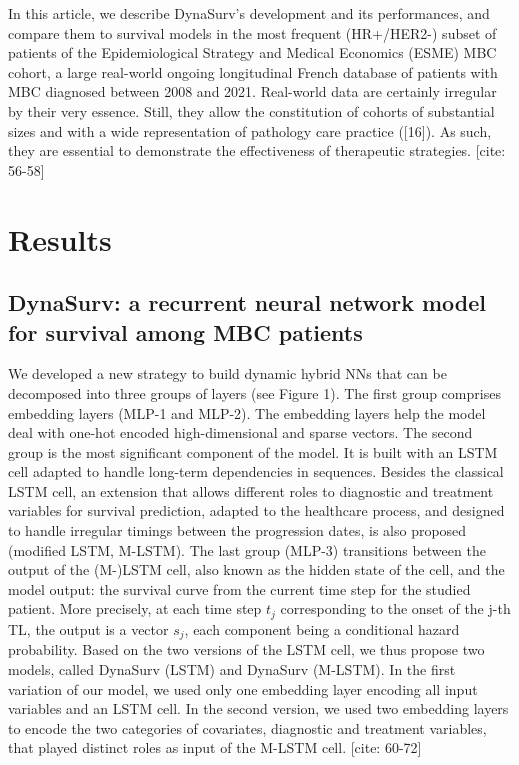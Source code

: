 \documentclass[a4paper,10pt]{article}
\begin{document}
In this article, we describe DynaSurv's development and its performances, and compare them to survival models in the most frequent (HR+/HER2-) subset of patients of the Epidemiological Strategy and Medical Economics (ESME) MBC cohort, a large real-world ongoing longitudinal French database of patients with MBC diagnosed between 2008 and 2021. Real-world data are certainly irregular by their very essence. Still, they allow the constitution of cohorts of substantial sizes and with a wide representation of pathology care practice ([16]). As such, they are essential to demonstrate the effectiveness of therapeutic strategies. [cite: 56-58]

\section{Results}

\subsection{DynaSurv: a recurrent neural network model for survival among MBC patients}
We developed a new strategy to build dynamic hybrid NNs that can be decomposed into three groups of layers (see Figure 1). The first group comprises embedding layers (MLP-1 and MLP-2). The embedding layers help the model deal with one-hot encoded high-dimensional and sparse vectors. The second group is the most significant component of the model. It is built with an LSTM cell adapted to handle long-term dependencies in sequences. Besides the classical LSTM cell, an extension that allows different roles to diagnostic and treatment variables for survival prediction, adapted to the healthcare process, and designed to handle irregular timings between the progression dates, is also proposed (modified LSTM, M-LSTM). The last group (MLP-3) transitions between the output of the (M-)LSTM cell, also known as the hidden state of the cell, and the model output: the survival curve from the current time step for the studied patient. More precisely, at each time step $t_j$ corresponding to the onset of the j-th TL, the output is a vector $s_j$, each component being a conditional hazard probability. Based on the two versions of the LSTM cell, we thus propose two models, called DynaSurv (LSTM) and DynaSurv (M-LSTM). In the first variation of our model, we used only one embedding layer encoding all input variables and an LSTM cell. In the second version, we used two embedding layers to encode the two categories of covariates, diagnostic and treatment variables, that played distinct roles as input of the M-LSTM cell. [cite: 60-72]
\end{document}
